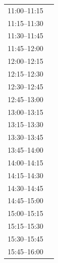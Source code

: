 \documentclass[11pt,a4paper]{article}
\begin{document}
\begin{center}
\begin{adjustbox}{max totalsize={\textwidth}{0.82\textheight},center}
\begin{tabular}{|p{3.6cm}|p{11cm}|}
\cline{1-1}
{\centering\rule{0pt}{2.80ex}11:00--11:15} & {\centering\rule{0pt}{2.80ex}} \\
\cline{1-1}
{\centering\rule{0pt}{2.80ex}11:15--11:30} & {\centering\rule{0pt}{2.80ex}} \\
\cline{1-1}
{\centering\rule{0pt}{2.80ex}11:30--11:45} & {\centering\rule{0pt}{2.80ex}} \\
\cline{1-1}
{\centering\rule{0pt}{2.80ex}11:45--12:00} & {\centering\rule{0pt}{2.80ex}} \\
\cline{1-1}
{\centering\rule{0pt}{2.80ex}12:00--12:15} & {\centering\rule{0pt}{2.80ex}} \\
\cline{1-1}
{\centering\rule{0pt}{2.80ex}12:15--12:30} & {\centering\rule{0pt}{2.80ex}} \\
\cline{1-1}
{\centering\rule{0pt}{2.80ex}12:30--12:45} & {\centering\rule{0pt}{2.80ex}} \\
\cline{1-1}
{\centering\rule{0pt}{2.80ex}12:45--13:00} & {\centering\rule{0pt}{2.80ex}} \\
\cline{1-1}
{\centering\rule{0pt}{2.80ex}13:00--13:15} & {\centering\rule{0pt}{2.80ex}} \\
\cline{1-1}
{\centering\rule{0pt}{2.80ex}13:15--13:30} & {\centering\rule{0pt}{2.80ex}} \\
\cline{1-1}
{\centering\rule{0pt}{2.80ex}13:30--13:45} & {\centering\rule{0pt}{2.80ex}} \\
\cline{1-1}
{\centering\rule{0pt}{2.80ex}13:45--14:00} & {\centering\rule{0pt}{2.80ex}} \\
\cline{1-1}
{\centering\rule{0pt}{2.80ex}14:00--14:15} & {\centering\rule{0pt}{2.80ex}} \\
\cline{1-1}
{\centering\rule{0pt}{2.80ex}14:15--14:30} & {\centering\rule{0pt}{2.80ex}} \\
\cline{1-1}
{\centering\rule{0pt}{2.80ex}14:30--14:45} & {\centering\rule{0pt}{2.80ex}} \\
\cline{1-1}
{\centering\rule{0pt}{2.80ex}14:45--15:00} & {\centering\rule{0pt}{2.80ex}} \\
\cline{1-1}
{\centering\rule{0pt}{2.80ex}15:00--15:15} & {\centering\rule{0pt}{2.80ex}} \\
\cline{1-1}
{\centering\rule{0pt}{2.80ex}15:15--15:30} & {\centering\rule{0pt}{2.80ex}} \\
\cline{1-1}
{\centering\rule{0pt}{2.80ex}15:30--15:45} & {\centering\rule{0pt}{2.80ex}} \\
\cline{1-1}
{\centering\rule{0pt}{2.80ex}15:45--16:00} & {\centering\rule{0pt}{2.80ex}} \\

\end{tabular}
\end{adjustbox}
\end{center}
\end{document}
